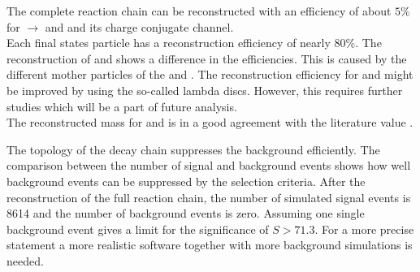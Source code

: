 The complete reaction chain can be reconstructed with an efficiency of about $5\%$ for \pbarp $\rightarrow$ \excitedcascade and \anticascade and its
charge conjugate channel.\\
Each final states particle has a reconstruction efficiency of nearly $80\%$.
The reconstruction of \lam and \alam shows a difference in the efficiencies.
This is caused by the different mother particles of the \lam and \alam. 
The reconstruction efficiency for \lam and \alam might be improved by using the so-called lambda discs.
However, this requires further studies which will be a part of future analysis.\\
The reconstructed mass for \excitedcascade and \excitedanticascade is in a good agreement with the literature value \cite{PDG}.

The topology of the decay chain suppresses the background efficiently.
The comparison between the number of signal and background events shows how well background events can be suppressed by the selection criteria.
After the reconstruction of the full reaction chain, the number of simulated signal events is 8614 and the number of background events is zero. 
Assuming one single background event gives a limit for the significance of $S>71.3$.
For a more precise statement a more realistic software together with more background simulations is needed. 

 
  


